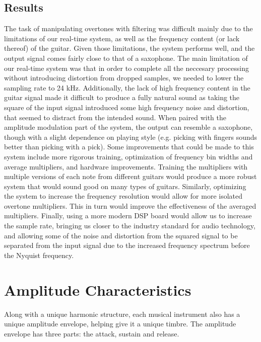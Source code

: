 \documentclass[twoside,a4paper]{article}
\begin{document}
\subsection {Results}
The task of manipulating overtones with filtering was difficult
mainly due to the limitations of our real-time system, as well as
the frequency content (or lack thereof) of the guitar. Given those
limitations, the system performs well, and the output signal comes fairly
close to that of a saxophone. The main limitation of our real-time system
was that in order to complete all the neccesary processing without introducing
distortion from dropped samples, we needed to lower the sampling rate to 24 kHz.
Additionally, the lack of high frequency content in the
guitar signal made it difficult to produce a fully natural sound
as taking the square of the input signal introduced some high frequency
noise and distortion, that seemed to distract from the intended sound.
When paired with the amplitude modulation part of the system, the output
can resemble a saxophone, though with a slight dependence on playing
style (e.g. picking with fingers sounds better than picking with a pick).
\newline\newline
Some improvements that could be made to this system include more rigorous training, optimization of
frequency bin widths and average multipliers, and hardware improvements.
Training the multipliers with multiple versions of each note from different
guitars would produce a more robust system that would sound good
on many types of guitars. Similarly, optimizing the system to increase the
frequency resolution would allow for more isolated overtone multipliers.
This in turn would improve the effectiveness of the averaged multipliers.
Finally, using a more modern DSP board would allow us to increase the sample rate,
bringing us closer to the industry standard for audio technology, and allowing some of the noise
and distortion from the squared signal to be separated from the input signal
due to the increased frequency spectrum before the Nyquist frequency.

\color{black}
\section{Amplitude Characteristics}
Along with a unique harmonic structure, each musical instrument
also has a unique amplitude envelope, helping give it a unique timbre.
The amplitude envelope has three parts: the attack, sustain and release. 
\end{document}

